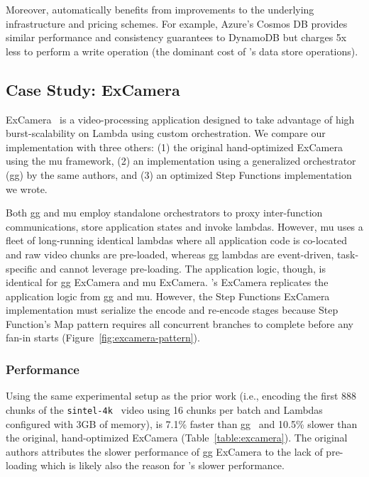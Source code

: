 Moreover, \name{} automatically benefits from improvements to the underlying
infrastructure and pricing schemes. For example, Azure's Cosmos DB provides
similar performance and consistency guarantees to DynamoDB but charges 5x less
to perform a write operation (the dominant cost of \name{}'s data store
operations).

\subsection{Case Study: ExCamera}\label{sec:eval:excamera}

ExCamera~\mbox{\cite{excamera}} is a video-processing application designed to
take advantage of high burst-scalability on Lambda using custom orchestration.
We compare our \name{} implementation with three others: (1) the original
hand-optimized ExCamera using the mu framework, (2) an implementation using a
generalized orchestrator (gg) by the same authors, and (3) an optimized Step
Functions implementation we wrote.

Both gg and mu employ standalone orchestrators to proxy inter-function
communications, store application states and invoke lambdas. However, mu uses
a fleet of long-running identical lambdas where all application code is
co-located and raw video chunks are pre-loaded, whereas gg lambdas are
event-driven, task-specific and cannot leverage pre-loading. The application
logic, though, is identical for gg ExCamera and mu ExCamera. \name{}'s
ExCamera replicates the application logic from gg and mu. However, the Step
Functions ExCamera implementation must serialize the encode and re-encode
stages because Step Function's Map pattern requires all concurrent branches to
complete before any fan-in starts (Figure~\ref {fig:excamera-pattern}).

\subsubsection{Performance}

Using the same experimental setup as the prior work (i.e., encoding the first
888 chunks of the \texttt{sintel-4k}~\mbox{\cite{sintel}} video using 16
chunks per batch and Lambdas configured with 3GB of memory), \name{} is 7.1\%
faster than gg~\mbox{\cite{gg-atc}} and 10.5\% slower than the original,
hand-optimized ExCamera (Table~\ref{table:excamera}). The original authors
attributes the slower performance of gg ExCamera to the lack of pre-loading
which is likely also the reason for \name{}'s slower performance.

